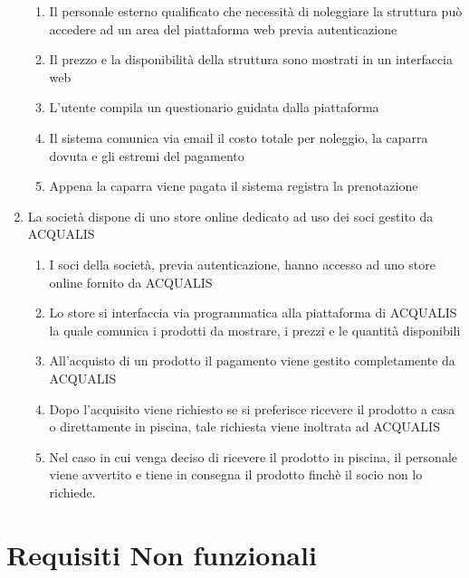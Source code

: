 \documentclass[11pt]{article} %
\begin{document}
\begin{enumerate}
	\begin{enumerate}
		\item Il personale esterno qualificato che necessità di noleggiare la struttura può accedere ad un area del piattaforma web previa autenticazione
		\item Il prezzo e la disponibilità della struttura sono mostrati in un interfaccia web
		\item L'utente compila un questionario guidata dalla piattaforma
		\item Il sistema comunica via email il costo totale per noleggio, la caparra dovuta e gli estremi del pagamento
		\item Appena la caparra viene pagata il sistema registra la prenotazione
	\end{enumerate}
	\item La società dispone di uno store online dedicato ad uso dei soci gestito da ACQUALIS
	\begin{enumerate}
		\item I soci della società, previa autenticazione, hanno accesso ad uno store online fornito da ACQUALIS
		\item Lo store si interfaccia via programmatica alla piattaforma di ACQUALIS la quale comunica i prodotti da mostrare, i prezzi e le quantità disponibili
		\item All'acquisto di un prodotto il pagamento viene gestito completamente da ACQUALIS
		\item Dopo l'acquisito viene richiesto se si preferisce ricevere il prodotto a casa o direttamente in piscina, tale richiesta viene inoltrata ad ACQUALIS
		\item Nel caso in cui venga deciso di ricevere il prodotto in piscina, il personale viene avvertito e tiene in consegna il prodotto finchè il socio non lo richiede.
	\end{enumerate}
\end{enumerate}

\section{Requisiti Non funzionali}
\end{document}
